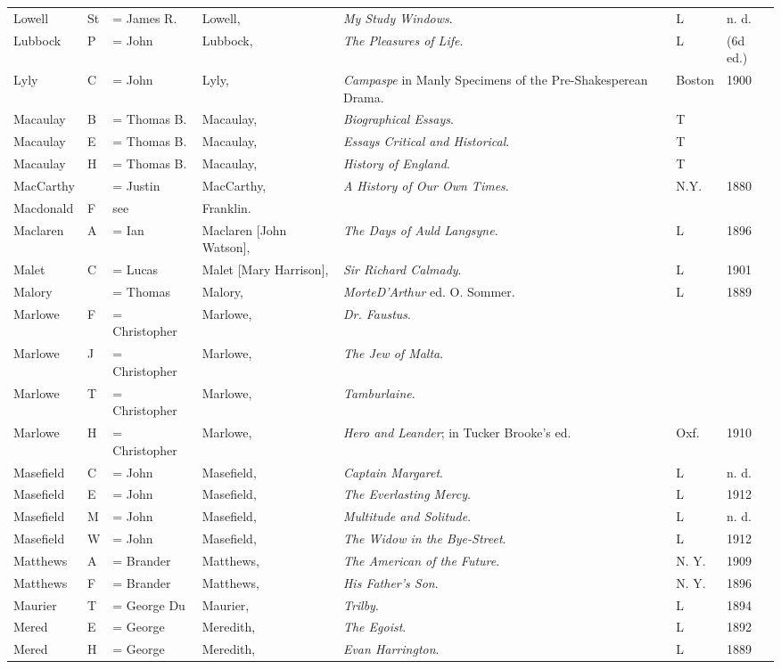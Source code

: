 \begin{sidewaystable}
\centering\small
\begin{tabular}{p{} p{} p{} p{} p{} p{} p{}}
Lowell& St & = James R. & Lowell, & \textit{My Study Windows}. & L & n. d. \\
Lubbock & P & = John & Lubbock, & \textit{The Pleasures of Life}. & L & (6d ed.) \\
Lyly & C & = John & Lyly, & \textit{Campaspe} in Manly Specimens of the Pre-Shakesperean Drama. & Boston & 1900 \\
Macaulay & B & = Thomas B. & Macaulay, & \textit{Biographical Essays}. & T & \\
Macaulay& E & = Thomas B. & Macaulay, & \textit{Essays Critical and Historical}. & T & \\
Macaulay& H & = Thomas B. & Macaulay, & \textit{History of England}. & T & \\
MacCarthy & & = Justin & MacCarthy, & \textit{A History of Our Own Times}. & N.Y. & 1880 \\
Macdonald & F & see & Franklin. & & & \\
Maclaren & A & = Ian & Maclaren [John Watson], & \textit{The Days of Auld Langsyne}. & L & 1896 \\
Malet & C & = Lucas & Malet [Mary Harrison], & \textit{Sir Richard Calmady}. & L & 1901 \\
Malory & & = Thomas & Malory, & \textit{MorteD'Arthur} ed. O. Sommer. & L & 1889 \\
Marlowe & F & = Christopher & Marlowe, & \textit{Dr. Faustus}. & & \\
Marlowe& J & = Christopher & Marlowe, & \textit{The Jew of Malta}. & & \\
Marlowe& T & = Christopher & Marlowe, & \textit{Tamburlaine}. & & \\
Marlowe & H & = Christopher & Marlowe, & \textit{Hero and Leander}; in Tucker Brooke's ed. & Oxf. & 1910 \\
Masefield & C & = John & Masefield, & \textit{Captain Margaret}. & L & n. d. \\
Masefield& E & = John & Masefield, & \textit{The Everlasting Mercy}. & L & 1912 \\
Masefield& M & = John & Masefield, & \textit{Multitude and Solitude}. & L & n. d. \\
Masefield& W & = John & Masefield, & \textit{The Widow in the Bye-Street}. & L & 1912 \\
Matthews & A & = Brander & Matthews, & \textit{The American of the Future}. & N. Y. & 1909 \\
Matthews& F & = Brander & Matthews, & \textit{His Father's Son}. & N. Y. & 1896 \\
Maurier & T & = George Du & Maurier, & \textit{Trilby}. & L & 1894 \\
Mered & E & = George & Meredith, & \textit{The Egoist}. & L & 1892 \\
Mered& H & = George & Meredith, & \textit{Evan Harrington}. & L & 1889 \\
\end{tabular}
\end{sidewaystable}

